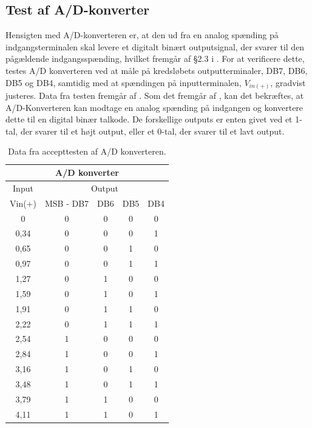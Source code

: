 \subsection{Test af A/D-konverter}
Hensigten med A/D-konverteren er, at den ud fra en analog spænding på indgangsterminalen skal levere et digitalt binært outputsignal, der svarer til den pågældende indgangsspænding, hvilket fremgår af §2.3 i . For at verificere dette, testes A/D konverteren ved at måle på kredsløbets outputterminaler, DB7, DB6, DB5 og DB4, samtidig med at spændingen på inputterminalen, $V_{in(+)}$, gradvist justeres. Data fra testen fremgår af . Som det fremgår af , kan det bekræftes, at A/D-Konverteren kan modtage en analog spænding på indgangen og konvertere dette til en digital binær talkode. De forskellige outputs er enten givet ved et 1-tal, der svarer til et højt output, eller et 0-tal, der svarer til et lavt output.          
%
\begin{table}[H]
\centering
\begin{tabular}{|c|c|c|c|c|}
\hline
\multicolumn{5}{|c|}{A/D konverter}  \\ \hline
Input  & \multicolumn{4}{c|}{Output} \\ \hline
Vin(+) & MSB - DB7 & DB6 & DB5 & DB4 \\ \hline
0      & 0         & 0   & 0   & 0   \\ \hline
0,34   & 0         & 0   & 0   & 1   \\ \hline
0,65   & 0         & 0   & 1   & 0   \\ \hline
0,97   & 0         & 0   & 1   & 1   \\ \hline
1,27   & 0         & 1   & 0   & 0   \\ \hline
1,59   & 0         & 1   & 0   & 1   \\ \hline
1,91   & 0         & 1   & 1   & 0   \\ \hline
2,22   & 0         & 1   & 1   & 1   \\ \hline
2,54   & 1         & 0   & 0   & 0   \\ \hline
2,84   & 1         & 0   & 0   & 1   \\ \hline
3,16   & 1         & 0   & 1   & 0   \\ \hline
3,48   & 1         & 0   & 1   & 1   \\ \hline
3,79   & 1         & 1   & 0   & 0   \\ \hline
4,11   & 1         & 1   & 0   & 1   \\ \hline
\end{tabular}
\caption{Data fra accepttesten af A/D konverteren.}
\label{tab:ADkonverter}
\end{table}
%

